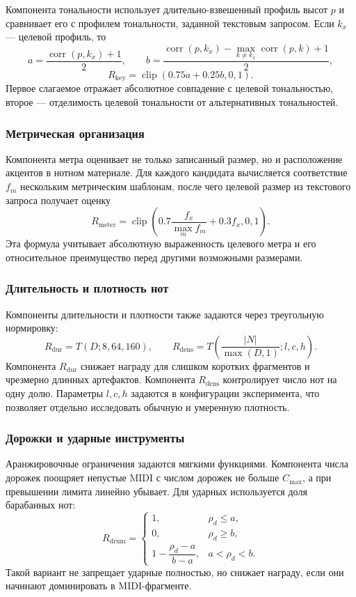 \documentclass[a4paper,12pt]{extarticle}
\begin{document}
Компонента тональности использует длительно-взвешенный профиль высот
$p$ и сравнивает его с профилем тональности, заданной текстовым
запросом. Если $k_x$ --- целевой профиль, то
\[
a=\frac{\operatorname{corr}(p,k_x)+1}{2}, \qquad
b=\frac{\operatorname{corr}(p,k_x)-\max_{k\ne k_x}\operatorname{corr}(p,k)+1}{2},
\]
\[
R_{\mathrm{key}}=\operatorname{clip}(0.75a+0.25b,0,1).
\]
Первое слагаемое отражает абсолютное совпадение с целевой тональностью,
второе --- отделимость целевой тональности от альтернативных
тональностей.

\subsubsection{Метрическая организация}

Компонента метра оценивает не только записанный размер, но и
расположение акцентов в нотном материале. Для каждого кандидата
вычисляется соответствие $f_m$ нескольким метрическим шаблонам, после
чего целевой размер из текстового запроса получает оценку
\[
R_{\mathrm{meter}}=
\operatorname{clip}\!\left(0.7\frac{f_x}{\max_m f_m}+0.3f_x,0,1\right).
\]
Эта формула учитывает абсолютную выраженность целевого метра и его
относительное преимущество перед другими возможными размерами.

\subsubsection{Длительность и плотность нот}

Компоненты длительности и плотности также задаются через треугольную
нормировку:
\[
R_{\mathrm{dur}}=T(D;8,64,160), \qquad
R_{\mathrm{dens}}=T\!\left(\frac{|N|}{\max(D,1)};l,c,h\right).
\]
Компонента $R_{\mathrm{dur}}$ снижает награду для слишком коротких
фрагментов и чрезмерно длинных артефактов. Компонента
$R_{\mathrm{dens}}$ контролирует число нот на одну долю. Параметры
$l,c,h$ задаются в конфигурации эксперимента, что позволяет отдельно
исследовать обычную и умеренную плотность.

\subsubsection{Дорожки и ударные инструменты}

Аранжировочные ограничения задаются мягкими функциями. Компонента числа
дорожек поощряет непустые MIDI с числом дорожек не больше $C_{\max}$,
а при превышении лимита линейно убывает. Для ударных используется доля
барабанных нот:
\[
R_{\mathrm{drum}}=
\begin{cases}
1, & \rho_d\le a,\\
0, & \rho_d\ge b,\\
1-\dfrac{\rho_d-a}{b-a}, & a<\rho_d<b.
\end{cases}
\]
Такой вариант не запрещает ударные полностью, но снижает награду, если
они начинают доминировать в MIDI-фрагменте.
\end{document}
